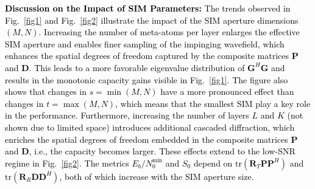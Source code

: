 \documentclass[twocolumn,10pt]{IEEEtran}
\begin{document}
	
\textcolor{black}{	\noindent\textbf{Discussion on the Impact of SIM Parameters:}
	The trends observed in Fig.~\ref{fig1} and Fig.~\ref{fig2} illustrate the
	impact of the SIM aperture dimensions $(M,N)$. Increasing the number of
	meta-atoms per layer enlarges the effective SIM aperture and enables finer
	sampling of the impinging wavefield, which enhances the spatial
	degrees of freedom captured by the composite matrices $\mathbf{P}$ and
	$\mathbf{D}$. This leads to a more favorable eigenvalue distribution of
	$\mathbf{G}^H\mathbf{G}$ and results in the monotonic capacity gains
	visible in Fig.~\ref{fig1}. The figure also shows that changes in
	$s=\min(M,N)$ have a more pronounced effect than changes in
	$t=\max(M,N)$, which means that the smallest SIM play a key role in the performance. Furthermore, increasing the number of layers $L$ and $K$ (not shown due to limited space) introduces
	additional cascaded diffraction, which enriches the
	spatial degrees of freedom embedded in the composite matrices $\mathbf{P}$
	and $\mathbf{D}$, i.e., the capacity becomes larger. These effects extend to the low-SNR regime in Fig.~\ref{fig2}. The metrics
	$E_b/N_0^{\min}$ and $S_0$ depend on
	$\mathrm{tr}(\mathbf{R}_T\mathbf{P}\mathbf{P}^H)$ and
	$\mathrm{tr}(\mathbf{R}_R\mathbf{D}\mathbf{D}^H)$, both of which increase
	with the SIM aperture size.}
	
	
	
\end{document}
